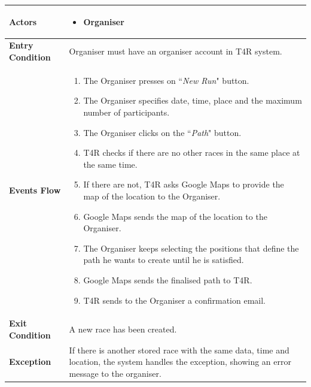             \begin{table}[H]
            	\centering
                
                \begin{tabular}{|p{3cm}|p{8.2cm}|}
                    \hline
                    \textbf{Actors} & \begin{itemize}
                        \item Organiser
                    \end{itemize} \\
                     \hline
                    \textbf{Entry Condition} & Organiser must have an organiser account in T4R system.\\
                     \hline
                    \textbf{Events Flow} & \begin{enumerate}
                                        \item The Organiser presses on ``\emph{New Run}" button.
                                        \item The Organiser specifies date, time, place and the maximum number of participants.
                                        \item The Organiser clicks on the ``\emph{Path}" button.
                                        \item T4R checks if there are no other races in the same place at the same time.
                                        \item If there are not, T4R asks Google Maps to provide the map of the location to the Organiser.
                                        \item Google Maps sends the map of the location to the Organiser.
                                        \item The Organiser keeps selecting the positions that define the path he wants to create until he is satisfied.
                                        \item Google Maps sends the finalised path to T4R.
                                        \item T4R sends to the Organiser a confirmation email.
                                            \end{enumerate}\\
                     \hline
                    \textbf{Exit Condition} & A new race has been created.\\
                     \hline
                    \textbf{Exception} & If there is another stored race with the same data, time and location, the system                       handles the exception, showing an error message to the organiser. \\
                     \hline
                \end{tabular}  
            \end{table} 
            
